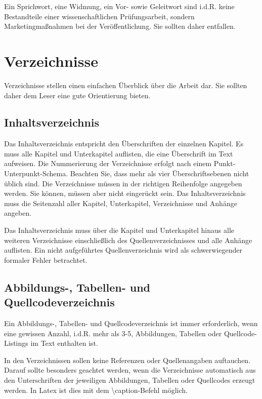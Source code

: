 Ein Sprichwort, eine Widmung, ein Vor- sowie Geleitwort sind i.d.R. keine Bestandteile einer wissenschaftlichen Prüfungsarbeit, sondern Marketingmaßnahmen bei der Veröffentlichung. Sie sollten daher entfallen.

\section{Verzeichnisse}\label{sec:structure:tables}
%
Verzeichnisse stellen einen einfachen Überblick über die Arbeit dar. Sie sollten daher dem Leser eine gute Orientierung bieten.

\subsection{Inhaltsverzeichnis}\label{sec:structure:tables:toc}
%
Das Inhaltsverzeichnis entspricht den Überschriften der einzelnen Kapitel. Es muss alle Kapitel und Unterkapitel auflisten, die eine Überschrift im Text aufweisen. Die Nummerierung der Verzeichnisse erfolgt nach einem Punkt-Unterpunkt-Schema. Beachten Sie, dass mehr als vier Überschriftsebenen nicht üblich sind. Die Verzeichnisse müssen in der richtigen Reihenfolge angegeben werden. Sie können, müssen aber nicht eingerückt sein. Das Inhaltsverzeichnis muss die Seitenzahl aller Kapitel, Unterkapitel, Verzeichnisse und Anhänge angeben.

Das Inhaltsverzeichnis muss über die Kapitel und Unterkapitel hinaus alle weiteren Verzeichnisse einschließlich des Quellenverzeichnisses und alle Anhänge auflisten. Ein nicht aufgeführtes Quellenverzeichnis wird als schwerwiegender formaler Fehler betrachtet.

\subsection{Abbildungs-, Tabellen- und Quellcodeverzeichnis}\label{sec:structure:tables:misc}
%
Ein Abbildungs-, Tabellen- und Quellcodeverzeichnis ist immer erforderlich, wenn eine gewissen Anzahl, i.d.R. mehr als 3-5, Abbildungen, Tabellen oder  Quellcode-Listings im Text enthalten ist.

In den Verzeichnissen sollen keine Referenzen oder Quellenangaben auftauchen. Darauf sollte besonders geachtet werden, wenn die Verzeichnisse automatisch aus den Unterschriften der jeweiligen Abbildungen, Tabellen oder Quellcodes erzeugt werden. In Latex ist dies mit dem \textbackslash caption-Befehl möglich.
\medskip

